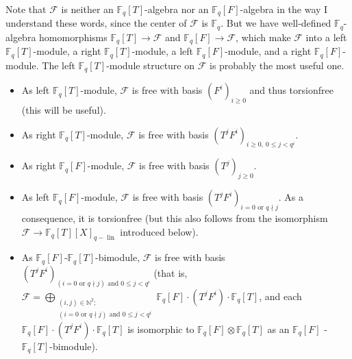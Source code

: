 \documentclass[numbers=enddot,12pt,final,onecolumn,notitlepage]{scrartcl}%
\theoremstyle{definition}
\begin{document}
Note that $\mathcal{F}$ is neither an $\mathbb{F}_{q}\left[  T\right]
$-algebra nor an $\mathbb{F}_{q}\left[  F\right]  $-algebra in the way I
understand these words, since the center of $\mathcal{F}$ is $\mathbb{F}_{q}$.
But we have well-defined $\mathbb{F}_{q}$-algebra homomorphisms $\mathbb{F}%
_{q}\left[  T\right]  \rightarrow\mathcal{F}$ and $\mathbb{F}_{q}\left[
F\right]  \rightarrow\mathcal{F}$, which make $\mathcal{F}$ into a left
$\mathbb{F}_{q}\left[  T\right]  $-module, a right $\mathbb{F}_{q}\left[
T\right]  $-module, a left $\mathbb{F}_{q}\left[  F\right]  $-module, and a
right $\mathbb{F}_{q}\left[  F\right]  $-module. The left $\mathbb{F}%
_{q}\left[  T\right]  $-module structure on $\mathcal{F}$ is probably the most
useful one.

\begin{itemize}
\item As left $\mathbb{F}_{q}\left[  T\right]  $-module, $\mathcal{F}$ is free
with basis $\left(  F^{i}\right)  _{i\geq0}$ and thus torsionfree (this will
be useful).

\item As right $\mathbb{F}_{q}\left[  T\right]  $-module, $\mathcal{F}$ is
free with basis $\left(  T^{j}F^{i}\right)  _{i\geq0,\ 0\leq j<q^{i}}$.

\item As right $\mathbb{F}_{q}\left[  F\right]  $-module, $\mathcal{F}$ is
free with basis $\left(  T^{j}\right)  _{j\geq0}$.

\item As left $\mathbb{F}_{q}\left[  F\right]  $-module, $\mathcal{F}$ is free
with basis $\left(  T^{j}F^{i}\right)  _{i=0\text{ or }q\nmid j}$. As a
consequence, it is torsionfree (but this also follows from the isomorphism
$\mathcal{F}\rightarrow\mathbb{F}_{q}\left[  T\right]  \left[  X\right]
_{q-\operatorname*{lin}}$ introduced below).

\item As $\mathbb{F}_{q}\left[  F\right]  $-$\mathbb{F}_{q}\left[  T\right]
$-bimodule, $\mathcal{F}$ is free with basis $\left(  T^{j}F^{i}\right)
_{\left(  i=0\text{ or }q\nmid j\right)  \text{ and }0\leq j<q^{i}}$ (that is,
$\mathcal{F}=\bigoplus\limits_{\substack{\left(  i,j\right)  \in\mathbb{N}%
^{2};\\\left(  i=0\text{ or }q\nmid j\right)  \text{ and }0\leq j<q^{i}%
}}\mathbb{F}_{q}\left[  F\right]  \cdot\left(  T^{j}F^{i}\right)
\cdot\mathbb{F}_{q}\left[  T\right]  $, and each $\mathbb{F}_{q}\left[
F\right]  \cdot\left(  T^{j}F^{i}\right)  \cdot\mathbb{F}_{q}\left[  T\right]
$ is isomorphic to $\mathbb{F}_{q}\left[  F\right]  \otimes\mathbb{F}%
_{q}\left[  T\right]  $ as an $\mathbb{F}_{q}\left[  F\right]  $%
-$\mathbb{F}_{q}\left[  T\right]  $-bimodule).
\end{itemize}
\end{document}
